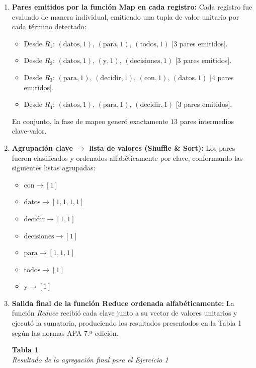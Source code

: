 \documentclass[12pt,a4paper]{article}
\begin{document}
\begin{enumerate}
    \item[a)] \textbf{Pares emitidos por la función Map en cada registro:}
    Cada registro fue evaluado de manera individual, emitiendo una tupla de valor unitario por cada término detectado:
    \begin{itemize}
        \item Desde $R_1$: $(\text{datos}, 1)$, $(\text{para}, 1)$, $(\text{todos}, 1)$ [3 pares emitidos].
        \item Desde $R_2$: $(\text{datos}, 1)$, $(\text{y}, 1)$, $(\text{decisiones}, 1)$ [3 pares emitidos].
        \item Desde $R_3$: $(\text{para}, 1)$, $(\text{decidir}, 1)$, $(\text{con}, 1)$, $(\text{datos}, 1)$ [4 pares emitidos].
        \item Desde $R_4$: $(\text{datos}, 1)$, $(\text{para}, 1)$, $(\text{decidir}, 1)$ [3 pares emitidos].
    \end{itemize}
    En conjunto, la fase de mapeo generó exactamente $13$ pares intermedios clave-valor.

    \item[b)] \textbf{Agrupación clave $\rightarrow$ lista de valores (Shuffle \& Sort):}
    Los pares fueron clasificados y ordenados alfabéticamente por clave, conformando las siguientes listas agrupadas:
    \begin{itemize}
        \item $\text{con} \longrightarrow [1]$
        \item $\text{datos} \longrightarrow [1, 1, 1, 1]$
        \item $\text{decidir} \longrightarrow [1, 1]$
        \item $\text{decisiones} \longrightarrow [1]$
        \item $\text{para} \longrightarrow [1, 1, 1]$
        \item $\text{todos} \longrightarrow [1]$
        \item $\text{y} \longrightarrow [1]$
    \end{itemize}

    \item[c)] \textbf{Salida final de la función Reduce ordenada alfabéticamente:}
    La función \textit{Reduce} recibió cada clave junto a su vector de valores unitarios y ejecutó la sumatoria, produciendo los resultados presentados en la Tabla 1 según las normas APA 7.ª edición.

    \begin{center}
    \small
    \noindent\textbf{Tabla 1} \\
    \textit{Resultado de la agregación final para el Ejercicio 1}
    \vspace{4pt}
    

\end{center}
\end{enumerate}
\end{document}
